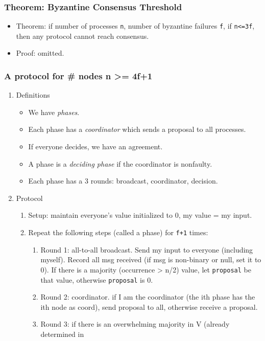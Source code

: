 \documentclass[11pt]{article}
\begin{document}
\subsubsection{Theorem: Byzantine Consensus Threshold}
\label{sec:org36b5128}
\begin{itemize}
\item Theorem: if number of processes \texttt{n}, number of byzantine failures \texttt{f}, if
\texttt{n<=3f}, then any protocol cannot reach consensus.
\item Proof: omitted.
\end{itemize}
\subsubsection{A protocol for \# nodes n >= 4f+1}
\label{sec:orgfd37491}
\begin{enumerate}
\item Definitions
\label{sec:org617f7f0}
\begin{itemize}
\item We have \emph{phases}.
\item Each phase has a \emph{coordinator} which sends a proposal to all processes.
\item If everyone decides, we have an agreement.
\item A phase is a \emph{deciding phase} if the coordinator is nonfaulty.
\item Each phase has a 3 rounds: broadcast, coordinator, decision.
\end{itemize}
\item Protocol
\label{sec:org1f3c5eb}
\begin{enumerate}
\item Setup: maintain everyone's value initialized to 0, my value = my input.
\item Repeat the following steps (called a phase) for \texttt{f+1} times:
\begin{enumerate}
\item Round 1: all-to-all broadcast. Send my input to everyone (including
myself). Record all msg received (if msg is non-binary or null, set it to
0). If there is a majority (occurrence > n/2) value, let \texttt{proposal} be that
value, otherwise \texttt{proposal} is 0.
\item Round 2: coordinator. if I am the coordinator (the ith phase has the ith node as
coord), send proposal to all, otherwise receive a proposal.
\item Round 3: if there is an overwhelming majority in V (already determined in

\end{enumerate}
\end{enumerate}
\end{enumerate}
\end{document}
